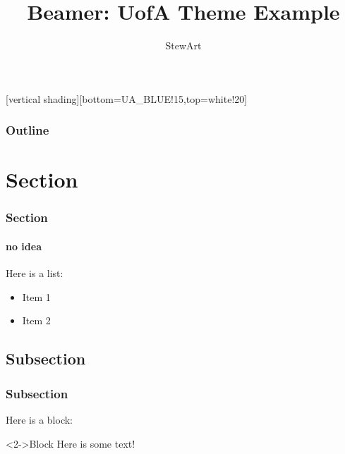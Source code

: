 \documentclass[14pt]{beamer}
\title[UofA Example]{Beamer: UofA Theme Example}
\author{StewArt}
\institute[UofA]{Stewart Observatory\\
University of Arizona}
\begin{document}
{
  [vertical
  shading][bottom=UA_BLUE!15,top=white!20]

\begin{frame}
\maketitle
\end{frame}}

\begin{frame}
\frametitle{Outline}
\tableofcontents[pausesections]
\end{frame}

\section{Section}\label{sec1}
\begin{frame}
  \frametitle{Section}
  \framesubtitle{no idea}
Here is a list:
\begin{itemize}
\item<1-> Item 1
\item<2-> Item 2
\end{itemize}
\end{frame}

\subsection{Subsection}\label{subsec1_1}
\begin{frame}
  \frametitle{Subsection}
Here is a block:
\vspace{-.05in}
\begin{block}<2->{Block}
Here is some text!
\end{block}
\end{frame}
\end{document}
